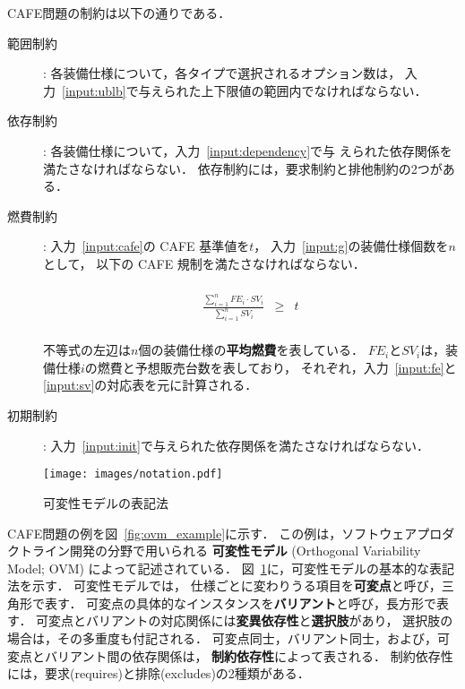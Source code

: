 CAFE問題の制約は以下の通りである．
\begin{description}
\item[範囲制約]: 各装備仕様について，各タイプで選択されるオプション数は，
  入力~\ref{input:ublb}で与えられた上下限値の範囲内でなければならない．
\item[依存制約]: 各装備仕様について，入力~\ref{input:dependency}で与
  えられた依存関係を満たさなければならない．
  依存制約には，要求制約と排他制約の2つがある．
\item[燃費制約]: 入力~\ref{input:cafe}の CAFE 基準値を$t$，
  入力~\ref{input:g}の装備仕様個数を$n$として，
  以下の CAFE 規制を満たさなければならない．
  \begin{adjustvboxheight}
  \[
    \begin{array}{lcr}
      & & \\
      \displaystyle\frac{\sum_{i=1}^{n} FE_{i}\cdot SV_{i}}{\sum_{i=1}^{n} SV_{i}}
      &
        \geq 
      &
        t \\
      & & 
    \end{array}
  \]
  \end{adjustvboxheight}
  不等式の左辺は$n$個の装備仕様の\textbf{平均燃費}を表している．
  $FE_{i}$と$SV_{i}$は，装備仕様$i$の燃費と予想販売台数を表しており，
  それぞれ，入力~\ref{input:fe}と\ref{input:sv}の対応表を元に計算される．
\item[初期制約]:
  入力~\ref{input:init}で与えられた依存関係を満たさなければならない．
\end{description}

\begin{figure}[tb]
  \centering
  \texttt{[image: images/notation.pdf]}
  \caption{可変性モデルの表記法\cite{Pohl05:sple}}
  \label{fig:ovm_notation}
\end{figure}

CAFE問題の例を図~\ref{fig:ovm_example}に示す．
この例は，ソフトウェアプロダクトライン開発の分野で用いられる
\textbf{可変性モデル} (Orthogonal Variability Model; OVM\cite{Pohl05:sple})
によって記述されている．
図~\ref{fig:ovm_notation}に，可変性モデルの基本的な表記法を示す．
可変性モデルでは，
仕様ごとに変わりうる項目を\textbf{可変点}と呼び，三角形で表す．
可変点の具体的なインスタンスを\textbf{バリアント}と呼び，長方形で表す．
可変点とバリアントの対応関係には\textbf{変異依存性}と\textbf{選択肢}があり，
選択肢の場合は，その多重度も付記される．
可変点同士，バリアント同士，および，可変点とバリアント間の依存関係は，
\textbf{制約依存性}によって表される．
制約依存性には，要求(\textsf{requires})と排除(\textsf{excludes})の2種類がある．

